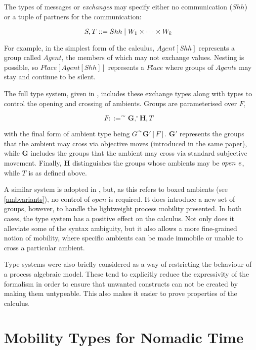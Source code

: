 The types of messages or \emph{exchanges} may specify either no
communication ($Shh$) or a tuple of partners for the communication:

\begin{equation}
S, T ::= Shh \;|\; W_1 \times \dots \times W_k
\end{equation}

\noindent For example, in the simplest form of the calculus,
$Agent[Shh]$ represents a group called $Agent$, the members of which
may not exchange values.  Nesting is possible, so \linebreak $Place[Agent[Shh]]$
represents a $Place$ where groups of $Agent$s may stay and continue to
be silent.

The full type system, given in \cite{ambienttypes}, includes these
exchange types along with types to control the opening and crossing of
ambients.  Groups are parameterised over $F$,

\begin{equation}
F ::= ^\curvearrowright \mathbf{G}, ^\circ \mathbf{H}, T
\end{equation}

\noindent with the final form of ambient type being $G^\curvearrowright
\mathbf{G'}[F]$.  $\mathbf{G'}$ represents the groups that the ambient
may cross via objective moves (introduced in the same paper), while
$\mathbf{G}$ includes the groups that the ambient may cross via standard
subjective movement.  Finally, $\mathbf{H}$ distinguishes the groups
whose ambients may be $open\ e$, while $T$ is as defined above.

A similar system is adopted in \cite*{m3}, but, as this refers to boxed
ambients (see \ref{ambvariants}), no control of $open$ is required.  It
does introduce a new set of groups, however, to handle the lightweight
process mobility presented.  In both cases, the type system has a
positive effect on the calculus.  Not only does it alleviate some of
the syntax ambiguity, but it also allows a more fine-grained notion of
mobility, where specific ambients can be made immobile or unable to
cross a particular ambient.

Type systems were also briefly considered as a way of restricting the
behaviour of a process algebraic model.  These tend to explicitly reduce
the expressivity of the formalism in order to ensure that unwanted
constructs can not be created by making them untypeable.  This also
makes it easier to prove properties of the calculus.  

\section{Mobility Types for Nomadic Time}
\label{typesys}

